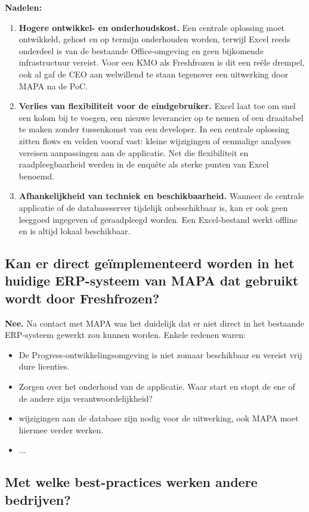 \textbf{Nadelen:}
\begin{enumerate}
    \item[1.] \textbf{Hogere ontwikkel- en onderhoudskost.} Een centrale oplossing moet ontwikkeld, gehost en op termijn onderhouden worden, terwijl Excel reeds onderdeel is van de bestaande Office-omgeving en geen bijkomende infrastructuur vereist. Voor een KMO als Freshfrozen is dit een reële drempel, ook al gaf de CEO aan welwillend te staan tegenover een uitwerking door MAPA na de PoC.
    \item[2.] \textbf{Verlies van flexibiliteit voor de eindgebruiker.} Excel laat toe om snel een kolom bij te voegen, een nieuwe leverancier op te nemen of een draaitabel te maken zonder tussenkomst van een developer. In een centrale oplossing zitten flows en velden vooraf vast: kleine wijzigingen of eenmalige analyses vereisen aanpassingen aan de applicatie. Net die flexibiliteit en raadpleegbaarheid werden in de enquête als sterke punten van Excel benoemd.
    \item[3.] \textbf{Afhankelijkheid van techniek en beschikbaarheid.} Wanneer de centrale applicatie of de databaseserver tijdelijk onbeschikbaar is, kan er ook geen leeggoed ingegeven of geraadpleegd worden. Een Excel-bestand werkt offline en is altijd lokaal beschikbaar.
\end{enumerate}

\subsection{Kan er direct geïmplementeerd worden in het huidige ERP-systeem van MAPA dat gebruikt wordt door Freshfrozen?}

\textbf{Nee.} Na contact met MAPA was het duidelijk dat er niet direct in het bestaande ERP-systeem gewerkt zou kunnen worden. Enkele redenen waren:
\begin{itemize}
    \item De Progress-ontwikkelingsomgeving is niet zomaar beschikbaar en vereist vrij dure licenties.
    \item Zorgen over het onderhoud van de applicatie. Waar start en stopt de ene of de andere zijn verantwoordelijkheid?
    \item wijzigingen aan de database zijn nodig voor de uitwerking, ook MAPA moet hiermee verder werken.
    \item ...
\end{itemize}

\subsection{Met welke best-practices werken andere bedrijven?}

